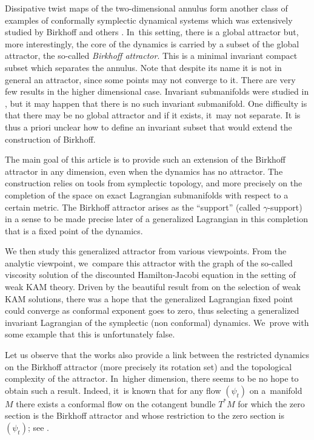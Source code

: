\documentclass[JEP,XML,SOM,Unicode,NoFloatCountersInSection,published]{cedram}
\theoremstyle{definition}
\begin{document}
Dissipative twist maps of the two-dimensional annulus form another class of examples of conformally symplectic dynamical systems which was extensively studied by Birkhoff and others \cite{Birkhoff-attractor,Charpentier-1,Charpentier-2,LeCalvez-Birkhoff1, LeCalvez-Birkhoff2}. In~this setting, there is a global attractor but, more interestingly, the core of the dynamics is carried by a subset of the global attractor, the so-called \emph{Birkhoff attractor}. This is a minimal invariant compact subset which separates the annulus. Note that despite its name it is not in general an attractor, since some points may not converge to it. There are very few results in the higher dimensional case. Invariant submanifolds were studied in \cite{Arnaud-Fejoz}, but it may happen that there is no such invariant submanifold. One difficulty is that there may be no global attractor and if it exists, it~may not separate. It is thus a priori unclear how to define an invariant subset that would extend the construction of Birkhoff.

The main goal of this article is to provide such an extension of the Birkhoff attractor in any dimension, even when the dynamics has no attractor. The construction relies on tools from symplectic topology, and more precisely on the completion of the space on exact Lagrangian submanifolds with respect to a certain metric. The Birkhoff attractor arises as the ``support'' (called $\gamma$\nobreakdash-support) in a sense to be made precise later of a generalized Lagrangian in this completion that is a fixed point of the dynamics.

We then study this generalized attractor from various viewpoints.
From the analytic viewpoint, we~compare this attractor with the graph of the so-called viscosity solution of the discounted Hamilton-Jacobi equation in the setting of weak KAM theory. Driven by the beautiful result from \cite{DFIZ} on the selection of weak KAM solutions, there was a hope that the generalized Lagrangian fixed point could converge as conformal exponent goes to zero, thus selecting a generalized invariant Lagrangian of the symplectic (non conformal) dynamics. We~prove with some example that this is unfortunately false.

Let us observe that the works \cite{Birkhoff-attractor,Charpentier-1,Charpentier-2} also provide a link between the restricted dynamics on the Birkhoff attractor (more precisely its rotation set) and the topological complexity of the attractor. In~higher dimension, there seems to be no hope to obtain such a result. Indeed, it~is known that for any flow $(\psi_t)$ on a~manifold~$M$ there exists a conformal flow on the cotangent bundle $T^*M$ for which the zero section is the Birkhoff attractor and whose restriction to the zero section is~$(\psi_t)$; see \cite[\S 7.1]{Arnaud-Fejoz}.
\end{document}
